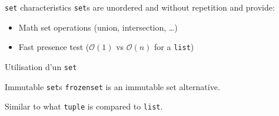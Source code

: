 \begin{frame}{\texttt{set} characteristics}
  \texttt{set}s are unordered and without repetition and provide:
  \begin{itemize}
    \item Math set operations (union, intersection, …)
    \item Fast presence test ($\mathcal{O}(1)$ vs $\mathcal{O}(n)$ for a \texttt{list})

  \end{itemize}
\end{frame}

\begin{frame}{Utilisation d'un \texttt{set}}
\end{frame}

\begin{frame}{Immutable \texttt{set}s}
  \texttt{frozenset} is an immutable set alternative.

  Similar to what \texttt{tuple} is compared to \texttt{list}.
\end{frame}

